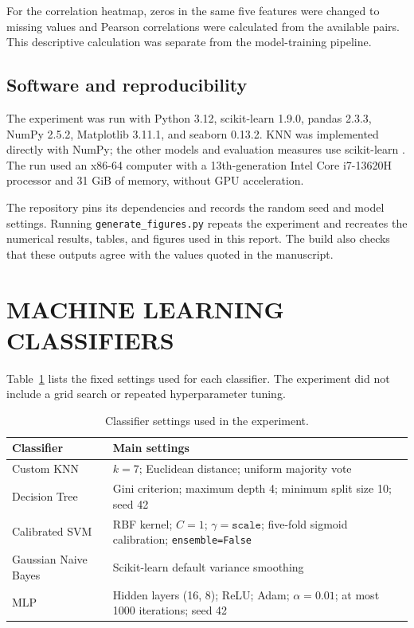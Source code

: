 \documentclass[pdflatex,sn-vancouver-num]{sn-jnl}
\begin{document}
For the correlation heatmap, zeros in the same five features were changed to missing values and Pearson correlations were calculated from the available pairs. This descriptive calculation was separate from the model-training pipeline.

\subsection{Software and reproducibility}\label{subsec:software}

The experiment was run with Python 3.12, scikit-learn 1.9.0, pandas 2.3.3, NumPy 2.5.2, Matplotlib 3.11.1, and seaborn 0.13.2. KNN was implemented directly with NumPy; the other models and evaluation measures use scikit-learn \cite{pedregosa2011scikit}. The run used an x86-64 computer with a 13th-generation Intel Core i7-13620H processor and 31 GiB of memory, without GPU acceleration.

The repository pins its dependencies and records the random seed and model settings. Running \texttt{generate\_figures.py} repeats the experiment and recreates the numerical results, tables, and figures used in this report. The build also checks that these outputs agree with the values quoted in the manuscript.

\section{MACHINE LEARNING CLASSIFIERS}\label{sec:models}

Table~\ref{tab:settings} lists the fixed settings used for each classifier. The experiment did not include a grid search or repeated hyperparameter tuning.

\begin{table}[!htbp]
\caption{Classifier settings used in the experiment.}\label{tab:settings}
\centering
\begin{tabular}{@{}p{}p{}@{}}
\toprule
Classifier & Main settings \\
\midrule
Custom KNN & $k=7$; Euclidean distance; uniform majority vote \\
Decision Tree & Gini criterion; maximum depth 4; minimum split size 10; seed 42 \\
Calibrated SVM & RBF kernel; $C=1$; $\gamma=\texttt{scale}$; five-fold sigmoid calibration; \texttt{ensemble=False} \\
Gaussian Naive Bayes & Scikit-learn default variance smoothing \\
MLP & Hidden layers (16, 8); ReLU; Adam; $\alpha=0.01$; at most 1000 iterations; seed 42 \\
\bottomrule
\end{tabular}
\end{table}
\end{document}
